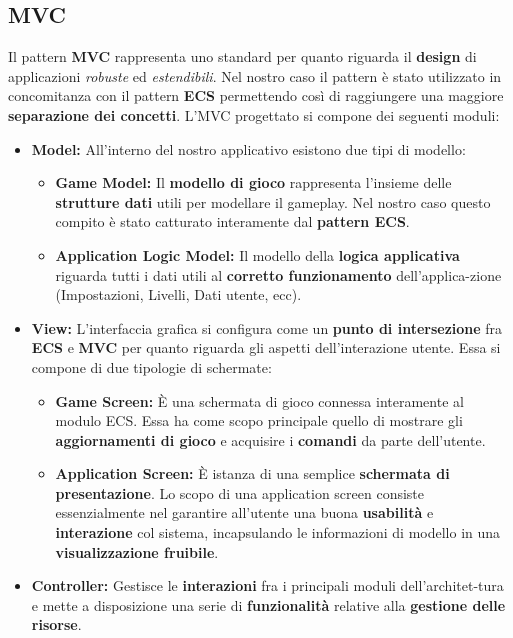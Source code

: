 \subsection{MVC}
Il pattern \textbf{MVC} rappresenta uno standard per quanto riguarda il \textbf{design} di applicazioni \textit{robuste} ed \textit{estendibili}. Nel nostro caso il pattern è stato utilizzato in concomitanza con il pattern \textbf{ECS} permettendo così di raggiungere una maggiore \textbf{separazione dei concetti}. L'MVC progettato si compone dei seguenti moduli:
\begin{itemize}
    \item \textbf{Model:}
    All'interno del nostro applicativo esistono due tipi di modello:
    \begin{itemize}
        \item \textbf{Game Model:}
        Il \textbf{modello di gioco} rappresenta l'insieme delle \textbf{strutture dati} utili per modellare il gameplay. Nel nostro caso questo compito è stato catturato interamente dal \textbf{pattern ECS}.
        \item \textbf{Application Logic Model:}
        Il modello della  \textbf{logica applicativa} riguarda tutti i dati utili al \textbf{corretto funzionamento} dell'applica-zione (Impostazioni, Livelli, Dati utente, ecc).
    \end{itemize}
    \item \textbf{View:}
    L'interfaccia grafica si configura  come un \textbf{punto di intersezione} fra \textbf{ECS} e \textbf{MVC} per quanto riguarda gli aspetti dell'interazione utente. Essa si compone di due tipologie di schermate:
    \begin{itemize}
        \item \textbf{Game Screen:}
        È una schermata di gioco connessa interamente al modulo ECS. Essa ha come scopo principale quello di mostrare gli \textbf{aggiornamenti di gioco} e acquisire i \textbf{comandi} da parte dell'utente.
        \item \textbf{Application Screen:}
        È istanza di una semplice \textbf{schermata di presentazione}. Lo scopo di una application screen consiste essenzialmente nel garantire all'utente una buona \textbf{usabilità} e \textbf{interazione} col sistema, incapsulando le informazioni di modello in una \textbf{visualizzazione fruibile}. 
    \end{itemize}
    \item \textbf{Controller:}
    Gestisce le \textbf{interazioni} fra i principali moduli dell'architet-tura e mette a disposizione una serie di \textbf{funzionalità} relative alla \textbf{gestione delle risorse}.
\end{itemize}

